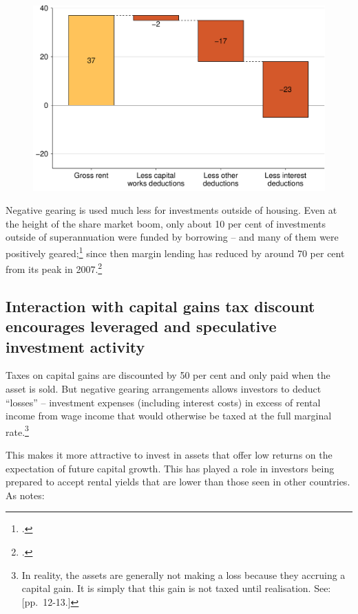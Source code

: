 \documentclass{grattan}\usepackage[]{graphicx}\usepackage[]{color}
\begin{document}
\begin{figure}
\includegraphics[width=\columnwidth]{figure/Interest_makes_up_the_bulk_of_rental_deductions-1}
\notes{}

\end{figure}

Negative gearing is used much less for investments outside of housing. Even at the height of the share market boom, only about 10 per cent of investments outside of superannuation were funded by borrowing -- and many of them were positively geared;\footcite{Daley2007}  since then margin lending has reduced by around 70 per cent from its peak in 2007.\footcite{RBA2015a}
\subsection{Interaction with capital gains tax discount encourages leveraged and speculative investment activity}
Taxes on capital gains are discounted by 50 per cent and only paid when the asset is sold. But negative gearing arrangements allows investors to deduct ``losses'' -- investment expenses  (including interest costs) in excess of rental income from wage income that would otherwise be taxed at the full marginal rate.\footnote{In reality, the assets are generally not making a loss because they accruing a capital gain. It is simply that this gain is not taxed until realisation. See: \textcite{ACOSS}[pp.~12-13.]}

This makes it more attractive to invest in assets that offer low returns on the expectation of future capital growth. This has played a role in investors being prepared to accept rental yields that are lower than those seen in other countries. As \textcite[p.~42]{RBA2014} notes:
\end{document}

